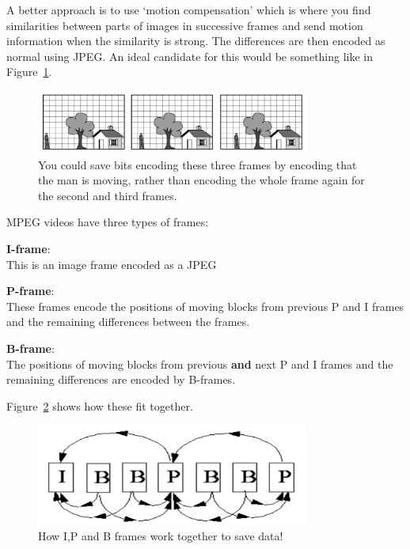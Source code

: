 A better approach is to use `motion compensation' which is where you find
similarities between parts of images in successive frames and send motion
information when the similarity is strong. The differences are then encoded as
normal using JPEG. An ideal candidate for this would be something like in
Figure~\ref{move-man}.

\begin{figure}[ht]
  \centering
  \includegraphics[width=0.8\textwidth]{images/move-man}
  \caption{You could save bits encoding these three frames by encoding that
  the man is moving, rather than encoding the whole frame again for the second
  and third frames.}
  \label{move-man}
\end{figure}

MPEG videos have three types of frames:

\begin{description}
  \item \textbf{I-frame}:\\
    This is an image frame encoded as a JPEG
  \item \textbf{P-frame}:\\
    These frames encode the positions of moving blocks from previous P and I
    frames and the remaining differences between the frames.
  \item \textbf{B-frame}:\\
    The positions of moving blocks from previous \textbf{and} next P and I
    frames and the remaining differences are encoded by B-frames.
\end{description}

Figure~\ref{frames} shows how these fit together.

\begin{figure}[ht]
  \centering
  \includegraphics[width=0.8\textwidth]{images/frames}
  \caption{How I,P and B frames work together to save data!}
  \label{frames}
\end{figure}

